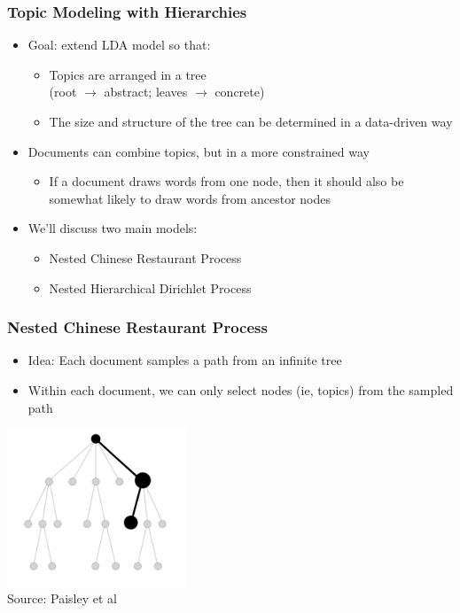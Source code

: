 

\begin{frame}
\frametitle{Topic Modeling with Hierarchies}
\begin{itemize}[<+->]
\item Goal: extend LDA model so that: %
    \begin{itemize}[<+->]
    \item Topics are arranged in a tree \\ (root $\rightarrow$ abstract; leaves $\rightarrow$ concrete)
    \item The size and structure of the tree can be determined in a data-driven way
    \end{itemize}
\item Documents can combine topics, but in a more constrained way
    \begin{itemize}
    \item If a document draws words from one node, then it should also be somewhat likely to draw words from ancestor nodes
    \end{itemize}
\item We'll discuss two main models:
    \begin{itemize}
    \item Nested Chinese Restaurant Process
    \item Nested Hierarchical Dirichlet Process
    \end{itemize}
\end{itemize}
\end{frame}

\begin{frame}
\frametitle{Nested Chinese Restaurant Process}
\begin{itemize}[<+->]
\item Idea: Each document samples a path from an infinite tree
\item Within each document, we can only select nodes (ie, topics) from the sampled path
\end{itemize}
\begin{center}
\includegraphics[width=0.4\textwidth]{../figures/ncrp.png} \\
{\tiny Source: Paisley et al \cite{paisley2015nhdp}}
\end{center}
\end{frame}

